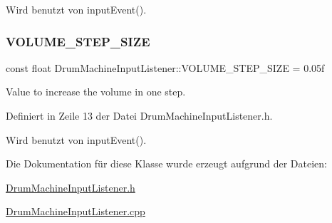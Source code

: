 Wird benutzt von input\+Event().

\mbox{\label{class_drum_machine_input_listener_a983e85ff0ebfbb3de0a917134488570c}} 
\subsubsection{\texorpdfstring{V\+O\+L\+U\+M\+E\+\_\+\+S\+T\+E\+P\+\_\+\+S\+I\+ZE}{VOLUME\_STEP\_SIZE}}
{\footnotesize\ttfamily const float Drum\+Machine\+Input\+Listener\+::\+V\+O\+L\+U\+M\+E\+\_\+\+S\+T\+E\+P\+\_\+\+S\+I\+ZE = 0.\+05f\hspace{0.3cm}{\ttfamily [private]}}



Value to increase the volume in one step. 



Definiert in Zeile 13 der Datei Drum\+Machine\+Input\+Listener.\+h.



Wird benutzt von input\+Event().



Die Dokumentation für diese Klasse wurde erzeugt aufgrund der Dateien\+:\begin{DoxyCompactItemize}
\item 
\hyperlink{_drum_machine_input_listener_8h}{Drum\+Machine\+Input\+Listener.\+h}\item 
\hyperlink{_drum_machine_input_listener_8cpp}{Drum\+Machine\+Input\+Listener.\+cpp}\end{DoxyCompactItemize}
